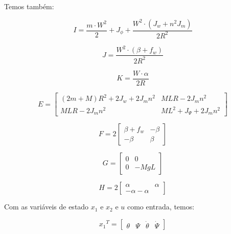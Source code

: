 \documentclass[12pt]{article}
\begin{document}
Temos também:

\begin{equation}
    I = \frac{m \cdot W^2}{2} + J_{\phi} + \frac{W^2 \cdot (J_w + n^2J_m)}{2R^2}
\end{equation}

\begin{equation}
    J = \frac{W^2 \cdot (\beta + f_w)}{2R^2}
\end{equation}

\begin{equation}
    K = \frac{W \cdot \alpha}{2R}
\end{equation}

\begin{equation}
    E = \begin{bmatrix}
      (2m + M)R^2 + 2J_w + 2J_m n^2 & MLR - 2J_m n^2\\
      MLR - 2J_m n^2 & ML^2 + J_{\Psi} + 2J_m n^2 
    \end{bmatrix}
\end{equation}

\begin{equation}
    F = 2 \begin{bmatrix}
      \beta + f_w & - \beta\\
      -\beta & \beta
    \end{bmatrix}
\end{equation}

\begin{equation}
    G = \begin{bmatrix}
    0 & 0 \\
    0 & -MgL
    \end{bmatrix}
\end{equation}

\begin{equation}
    H = 2 \begin{bmatrix}
      \alpha & \alpha \\
      -\alpha - \alpha
    \end{bmatrix}
\end{equation}

Com as variáveis de estado $x_1$ e $x_2$ e $u$ como entrada, temos:

\begin{equation*}
    {x_1}^{T} = \begin{bmatrix}
      \theta & \Psi & \dot{\theta} & \dot{\Psi}
    \end{bmatrix}
\end{equation*}
\end{document}
